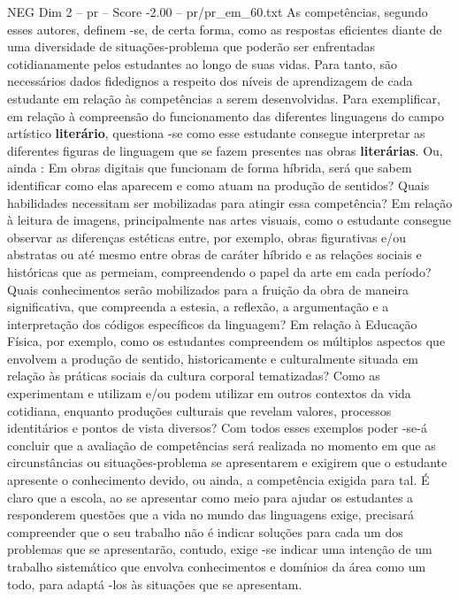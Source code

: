 \begin{textsample}{NEG Dim 2 – pr – Score -2.00 – pr/pr\_em\_60.txt}  \label{ex:f2_neg_172}
As competências, segundo esses autores, definem -se, de certa forma, como as respostas eficientes diante de uma diversidade de situações-problema que poderão ser enfrentadas cotidianamente pelos estudantes ao longo de suas vidas.
Para tanto, são necessários dados fidedignos a respeito dos níveis de aprendizagem de cada estudante em relação às competências a serem desenvolvidas.
Para exemplificar, em relação à compreensão do funcionamento das diferentes linguagens do campo artístico \textbf{literário}, questiona -se como esse estudante consegue interpretar as diferentes figuras de linguagem que se fazem presentes nas obras \textbf{literárias}.
Ou, ainda : Em obras digitais que funcionam de forma híbrida, será que sabem identificar como elas aparecem e como atuam na produção de sentidos?
Quais habilidades necessitam ser mobilizadas para atingir essa competência?
Em relação à leitura de imagens, principalmente nas artes visuais, como o estudante consegue observar as diferenças estéticas entre, por exemplo, obras figurativas e/ou abstratas ou até mesmo entre obras de caráter híbrido e as relações sociais e históricas que as permeiam, compreendendo o papel da arte em cada período?
Quais conhecimentos serão mobilizados para a fruição da obra de maneira significativa, que compreenda a estesia, a reflexão, a argumentação e a interpretação dos códigos específicos da linguagem?
Em relação à Educação Física, por exemplo, como os estudantes compreendem os múltiplos aspectos que envolvem a produção de sentido, historicamente e culturalmente situada em relação às práticas sociais da cultura corporal tematizadas?
Como as experimentam e utilizam e/ou podem utilizar em outros contextos da vida cotidiana, enquanto produções culturais que revelam valores, processos identitários e pontos de vista diversos?
Com todos esses exemplos poder -se-á concluir que a avaliação de competências será realizada no momento em que as circunstâncias ou situações-problema se apresentarem e exigirem que o estudante apresente o conhecimento devido, ou ainda, a competência exigida para tal.
É claro que a escola, ao se apresentar como meio para ajudar os estudantes a responderem questões que a vida no mundo das linguagens exige, precisará compreender que o seu trabalho não é indicar soluções para cada um dos problemas que se apresentarão, contudo, exige -se indicar uma intenção de um trabalho sistemático que envolva conhecimentos e domínios da área como um todo, para adaptá -los às situações que se apresentam.

\end{textsample}
